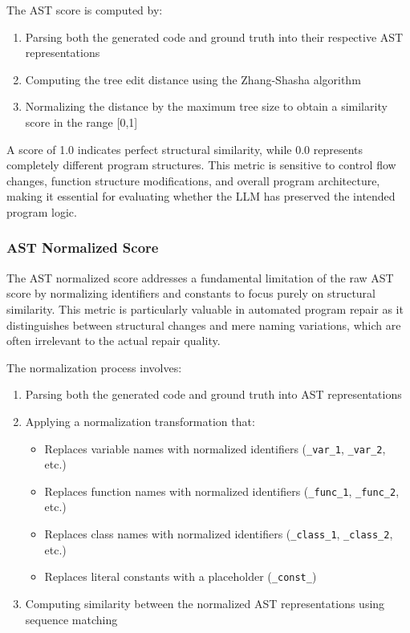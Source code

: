 The AST score is computed by:
\begin{enumerate}
    \item Parsing both the generated code and ground truth into their respective AST representations
    \item Computing the tree edit distance using the Zhang-Shasha algorithm \cite{zhang1989simple}
    \item Normalizing the distance by the maximum tree size to obtain a similarity score in the range [0,1]
\end{enumerate}

A score of 1.0 indicates perfect structural similarity, while 0.0 represents completely different program structures. This metric is sensitive to control flow changes, function structure modifications, and overall program architecture, making it essential for evaluating whether the LLM has preserved the intended program logic.

\subsubsection{AST Normalized Score}
The AST normalized score addresses a fundamental limitation of the raw AST score by normalizing identifiers and constants to focus purely on structural similarity. This metric is particularly valuable in automated program repair as it distinguishes between structural changes and mere naming variations, which are often irrelevant to the actual repair quality.

The normalization process involves:
\begin{enumerate}
    \item Parsing both the generated code and ground truth into AST representations
    \item Applying a normalization transformation that:
        \begin{itemize}
            \item Replaces variable names with normalized identifiers (\texttt{\_var\_1}, \texttt{\_var\_2}, etc.)
            \item Replaces function names with normalized identifiers (\texttt{\_func\_1}, \texttt{\_func\_2}, etc.)
            \item Replaces class names with normalized identifiers (\texttt{\_class\_1}, \texttt{\_class\_2}, etc.)
            \item Replaces literal constants with a placeholder (\texttt{\_const\_})
        \end{itemize}
    \item Computing similarity between the normalized AST representations using sequence matching
\end{enumerate}

